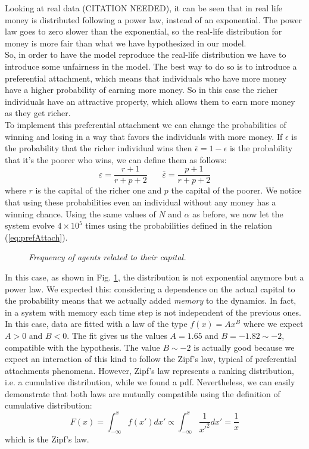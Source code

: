 Looking at real data (CITATION NEEDED), it can be seen that in real life money is distributed following a power law, instead of an exponential.
The power law goes to zero slower than the exponential, so the real-life distribution for money is more fair than what we have hypothesized in our model. \\
So, in order to have the model reproduce the real-life distribution we have to introduce some unfairness in the model.
The best way to do so is to introduce a preferential attachment, which means that individuals who have more money have a higher probability of earning more money.
So in this case the richer individuals have an attractive property, which allows them to earn more money as they get richer. \\
To implement this preferential attachment we can change the probabilities of winning and losing in a way that favors the individuals with more money.
If $\epsilon$ is the probability that the richer individual wins then $\bar{\epsilon} = 1 - \epsilon$ is the probability that it's the poorer who wins, we can define them as follows:
\begin{equation}
	\varepsilon = \frac{r + 1}{r + p + 2} \ \ \ \ \ \ \ \  \bar{\varepsilon} = \frac{p + 1}{r + p + 2}
	\label{eq:prefAttach}
\end{equation}
where $r$ is the capital of the richer one and $p$ the capital of the poorer.
We notice that using these probabilities even an individual without any money has a winning chance.
Using the same values of $N$ and $\alpha$ as before, we now let the system evolve $4 \times 10^5$ times using the probabilities defined in the relation (\ref{eq:prefAttach}).
\begin{figure}[ht!]
    \centering
    \scalebox{.7}{}
    \caption{\emph{Frequency of agents related to their capital.}}
    \label{fig:prefAttach}
\end{figure}
In this case, as shown in Fig. \ref{fig:prefAttach}, the distribution is not exponential anymore but a power law.
We expected this: considering a dependence on the actual capital to the probability means that we actually added \emph{memory} to the dynamics.
In fact, in a system with memory each time step is not independent of the previous ones.
In this case, data are fitted with a law of the type $f(x) = Ax^B$ where we expect $A > 0$ and $B < 0$.
The fit gives us the values $A = 1.65$ and $B = -1.82 \sim -2$, compatible with the hypothesis.
The value $B \sim -2$ is actually good because we expect an interaction of this kind to follow the Zipf's law, typical of preferential attachments phenomena.
However, Zipf's law represents a ranking distribution, i.e. a cumulative distribution, while we found a pdf.
Nevertheless, we can easily demonstrate that both laws are mutually compatible using the definition of cumulative distribution:
\begin{equation}
	F(x) = \int_{-\infty}^x f(x') dx' \propto \int_{-\infty}^x \frac{1}{{x'}^2} dx' = \frac{1}{x}
\end{equation}
which is the Zipf's law.
